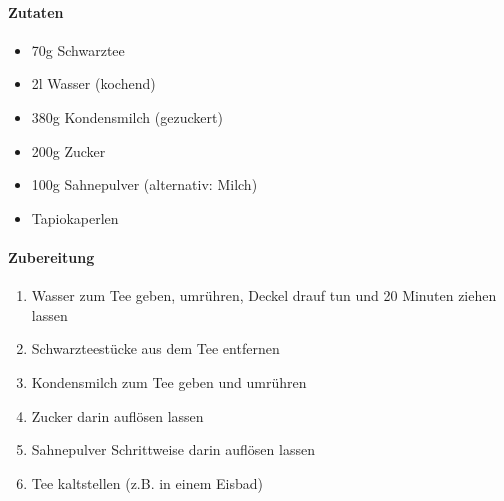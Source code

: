 \paragraph{Zutaten}
\begin{itemize}[noitemsep]
	\item 70g Schwarztee
	\item 2l Wasser (kochend)
	\item 380g Kondensmilch (gezuckert)
	\item 200g Zucker
	\item 100g Sahnepulver (alternativ: Milch)
	\item Tapiokaperlen
\end{itemize}


\paragraph{Zubereitung}
\begin{enumerate}[noitemsep]
	\item Wasser zum Tee geben, umrühren, Deckel drauf tun und 20 Minuten ziehen lassen
	\item Schwarzteestücke aus dem Tee entfernen
	\item Kondensmilch zum Tee geben und umrühren
	\item Zucker darin auflösen lassen
	\item Sahnepulver Schrittweise darin auflösen lassen
	\item Tee kaltstellen (z.B. in einem Eisbad)
\end{enumerate}